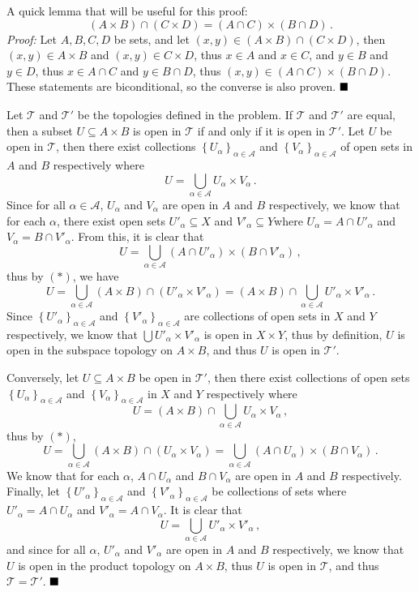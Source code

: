 \documentclass[12pt]{article}
\newcommand{\done}{
    \ensuremath{\strut\hfill\blacksquare}
}
\newcommand{\braces}[1]{\left\{#1\right\}}           %
\begin{document}
\pagestyle{fancy}
\fancyhead{}

\normalsize

A quick lemma that will be useful for this proof:
\begin{equation}\tag{$*$}
    (A\times B)\cap(C\times D)=(A\cap C)\times(B\cap D)\,.
\end{equation}
\textit{Proof:} Let $A,B,C,D$ be sets, and let $(x,y)\in(A\times B)\cap(C\times D)$, then $(x,y)\in A\times B$ and $(x,y)\in C\times D$, thus $x\in A$ and $x\in C$, and $y\in B$ and $y\in D$, thus $x\in A\cap C$ and $y\in B\cap D$, thus $(x,y)\in(A\cap C)\times(B\cap D)$. These statements are biconditional, so the converse is also proven. \done

Let $\mathcal{T}$ and $\mathcal{T}'$ be the topologies defined in the problem. If $\mathcal{T}$ and $\mathcal{T}'$ are equal, then a subset $U\subseteq A\times B$ is open in $\mathcal{T}$ if and only if it is open in $\mathcal{T}'$. Let $U$ be open in $\mathcal{T}$, then there exist collections $\braces{U_\alpha}_{\alpha\in\mathcal{A}}$ and $\braces{V_\alpha}_{\alpha\in\mathcal{A}}$ of open sets in $A$ and $B$ respectively where
\[U=\bigcup_{\alpha\in\mathcal{A}}U_\alpha\times V_\alpha\,.\]
Since for all $\alpha\in\mathcal{A}$, $U_\alpha$ and $V_\alpha$ are open in $A$ and $B$ respectively, we know that for each $\alpha$, there exist open sets $U'_\alpha\subseteq X$ and $V'_\alpha\subseteq Y$where $U_\alpha=A\cap U'_\alpha$ and $V_\alpha=B\cap V'_\alpha$. From this, it is clear that
\[U=\bigcup_{\alpha\in\mathcal{A}}(A\cap U'_\alpha)\times(B\cap V'_\alpha)\,,\]
thus by $(*)$, we have
\[U=\bigcup_{\alpha\in\mathcal{A}}(A\times B)\cap(U'_\alpha\times V'_\alpha)=(A\times B)\cap\bigcup_{\alpha\in\mathcal{A}}U'_\alpha\times V'_\alpha\,.\]
Since $\braces{U'_{\alpha}}_{\alpha\in\mathcal{A}}$ and $\braces{V'_{\alpha}}_{\alpha\in\mathcal{A}}$ are collections of open sets in $X$ and $Y$ respectively, we know that $\displaystyle\bigcup U'_\alpha\times V'_\alpha$ is open in $X\times Y$, thus by definition, $U$ is open in the subspace topology on $A\times B$, and thus $U$ is open in $\mathcal{T}'$.

Conversely, let $U\subseteq A\times B$ be open in $\mathcal{T}'$, then there exist collections of open sets $\braces{U_\alpha}_{\alpha\in\mathcal{A}}$ and $\braces{V_\alpha}_{\alpha\in\mathcal{A}}$ in $X$ and $Y$ respectively where
\[U=(A\times B)\cap\bigcup_{\alpha\in\mathcal{A}}U_\alpha\times V_\alpha\,,\]
thus by $(*)$,
\[U=\bigcup_{\alpha\in\mathcal{A}}(A\times B)\cap(U_\alpha\times V_\alpha)=\bigcup_{\alpha\in\mathcal{A}}(A\cap U_{\alpha})\times(B\cap V_\alpha)\,.\]
We know that for each $\alpha$, $A\cap U_\alpha$ and $B\cap V_\alpha$ are open in $A$ and $B$ respectively. Finally, let $\braces{U'_\alpha}_{\alpha\in\mathcal{A}}$ and $\braces{V'_\alpha}_{\alpha\in\mathcal{A}}$ be collections of sets where $U'_{\alpha}=A\cap U_\alpha$ and $V'_\alpha=A\cap V_\alpha$. It is clear that
\[U=\bigcup_{\alpha\in\mathcal{A}}U'_\alpha\times V'_\alpha\,,\]
and since for all $\alpha$, $U'_\alpha$ and $V'_\alpha$ are open in $A$ and $B$ respectively, we know that $U$ is open in the product topology on $A\times B$, thus $U$ is open in $\mathcal{T}$, and thus $\mathcal{T}=\mathcal{T}'$. \done
\end{document}
